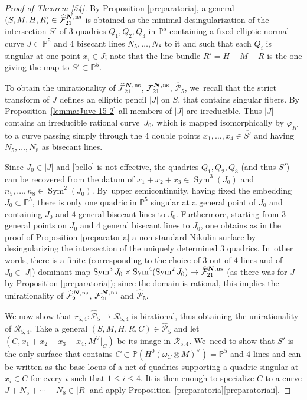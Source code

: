 \documentclass[11pt]{article}
\newcommand{\ns}{{\mkern1mu\mathrm{ns}}}
\newcommand{\bN}{\boldsymbol{N}}
\theoremstyle{plain}
\theoremstyle{definition}
\DeclareMathOperator{\Sym}{Sym}
\newcommand\PP{{\mathbb P}}
\newcommand\F{{\mathcal F}}
\renewcommand\P{{\mathcal P}}
\begin{document}
\begin{proof}[Proof of Theorem \ref{54}]
By Proposition \ref{preparatoria}, a general $(S,M,H,R)\in
\widehat{\F}_{21}^{\bN,\ns}$ is obtained as the minimal desingularization of the intersection $\overline{S'}$ of $3$ quadrics $Q_1,Q_2,Q_3$ in $\PP^5$ containing a fixed elliptic normal curve $J\subset \PP^5$ and $4$ bisecant lines $N_5,\ldots, N_8$ to it and such that each $Q_i$ is singular at one point $x_i\in J$; note that the line bundle $R'=H-M-R$ is the one giving the map to $\overline{S'}\subset\PP^5$.

To obtain the unirationality of $\widehat{\F}_{21}^{\bN,\ns}$, $\F_{21}^{\bN,\ns}$, $\widehat\P_{5}$, we~recall that the strict transform of $J$ defines an elliptic pencil $|J|$ on $S$, that contains singular fibers. By Proposition~\ref{lemma:Juve-15-2} all members of $|J|$ are irreducible. Thus $|J|$ contains an irreducible rational curve~$J_0$, which is mapped isomorphically by $\varphi_{R'}$ to a curve passing simply through the $4$ double points $x_1,\ldots,x_4\in\overline{S'}$ and having $N_5,\ldots, N_8$ as bisecant lines.

Since $J_0\in |J|$ and \eqref{bello} is not effective, the quadrics $Q_1,Q_2,Q_3$ (and thus $\overline{S'}$) can be recovered from the datum of $x_1+x_2+x_3\in \Sym^3(J_0)$ and $n_5,\ldots, n_8\in\Sym^2(J_0)$. By~upper semicontinuity, having fixed the embedding $J_0\subset \PP^5$, there is only one quadric in $\PP^5$ singular at a general point of $J_0$ and containing $J_0$ and $4$ general bisecant lines to $J_0$. Furthermore, starting from $3$ general points on $J_0$ and $4$ general bisecant lines to $J_0$, one obtains as in the proof of Proposition \ref{preparatoria} a
non-standard Nikulin surface by desingularizing the intersection of the uniquely determined $3$ quadrics. In~other words, there is a finite (corresponding to the choice of $3$ out of $4$ lines and of $J_0\in |J|$) dominant map $\Sym^3{J_0}\times \Sym^4(\Sym^2J_0)\to \widehat{\F}_{21}^{\bN,\ns}$ (as there was for $J$ by Proposition \ref{preparatoria}); since the domain is rational, this implies the unirationality of $\widehat{\F}_{21}^{\bN,\ns}$, $\F_{21}^{\bN,\ns}$ and $\widehat\P_{5}$.

We now show that $r_{5,4}:\widehat\P_{5}\to \mathcal R_{5,4}$ is birational, thus obtaining the unirationality of $\mathcal R_{5,4}$. Take a general $(S,M,H,R,C)\in \widehat\P_{5}$ and let $(C,x_1+x_2+x_3+x_4,M^\vee|_C)$ be its image in $\mathcal R_{5,4}$. We~need to show that $\overline{S'}$ is the only surface that contains $C\subset \PP(H^0(\omega_C\otimes M)^\vee)=\mathbb P^5$ and $4$ lines and can be written as the base locus of a net of quadrics supporting a quadric singular at $x_i\in C$ for every $i$ such that $1\leq i\leq 4$. It is then enough to specialize $C$ to a curve $J+N_5+\cdots+N_8\in |R|$ and apply Proposition~\ref{preparatoria}\eqref{preparatoriaii}.
\end{proof}
\end{document}
